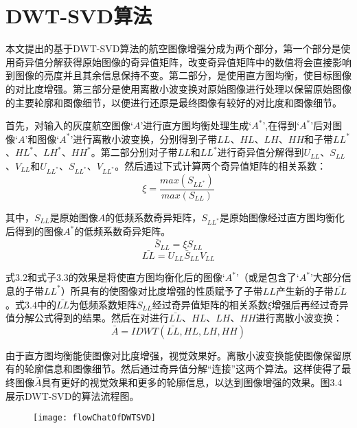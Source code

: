 	\section{DWT-SVD算法}本文提出的基于DWT-SVD算法的航空图像增强分成为两个部分，第一个部分是使用奇异值分解获得原始图像的奇异值矩阵，改变奇异值矩阵中的数值将会直接影响到图像的亮度并且其余信息保持不变\cite{improved...}。第二部分，是使用直方图均衡，使目标图像的对比度增强。第三部分是使用离散小波变换对原始图像进行处理以保留原始图像的主要轮廓和图像细节，以便进行还原是最终图像有较好的对比度和图像细节。

首先，对输入的灰度航空图像‘$A$’进行直方图均衡处理生成‘$A^*$’,在得到‘$A^*$’后对图像‘$A$’和图像‘$A^*$’进行离散小波变换，分别得到子带$LL$、$HL$、$LH$、$HH$和子带$LL^*$、$HL^*$、$LH^*$、$HH^*$。第二部分别对子带$LL$和$LL^*$进行奇异值分解得到$U_{LL}$、$S_{LL}$、$V_{LL}$和$U_ {LL^*}$、$S_{LL^*}$、$V_{LL^*}$。然后通过下式计算两个奇异值矩阵的相关系数：
\begin{equation}     \xi = \frac{max \left( S_{LL^*} \right) }{ max \left( S_{LL} \right) }    \end{equation}

其中，$S_{LL}$是原始图像$A$的低频系数奇异矩阵，$S_{LL^*}$是原始图像经过直方图均衡化后得到的图像$A^*$的低频系数奇异矩阵。
\begin{equation}     \bar{S}_{LL} = \xi S_{LL}    \end{equation}
\begin{equation}     \bar{LL} =  U_{LL} \bar{S}_{LL} V_{LL} \end{equation}

式$3.2$和式子$3.3$的效果是将使直方图均衡化后的图像‘$A^*$’（或是包含了‘$A^*$’大部分信息的子带$LL^*$）所具有的使图像对比度增强的性质赋予了子带$LL$产生新的子带$\bar{LL}$。式$3.4$中的$\bar{LL}$为低频系数矩阵$S_{LL}$经过奇异值矩阵的相关系数$\xi$增强后再经过奇异值分解公式得到的结果。然后在对进行$\bar{LL}$、$HL$、$LH$、$HH$进行离散小波变换：
\begin{equation}     \bar{A} = IDWT(\bar{LL},HL,LH,HH)    \end{equation}

由于直方图均衡能使图像对比度增强，视觉效果好。离散小波变换能使图像保留原有的轮廓信息和图像细节。然后通过奇异值分解“连接”这两个算法。这样使得了最终图像$\bar{A}$具有更好的视觉效果和更多的轮廓信息，以达到图像增强的效果。图3.4展示DWT-SVD的算法流程图。

\begin{figure}[htb!]
    \centering
    \texttt{[image: flowChatOfDWTSVD]}
    \label{fig:tc_q_criteria}
\end{figure}

